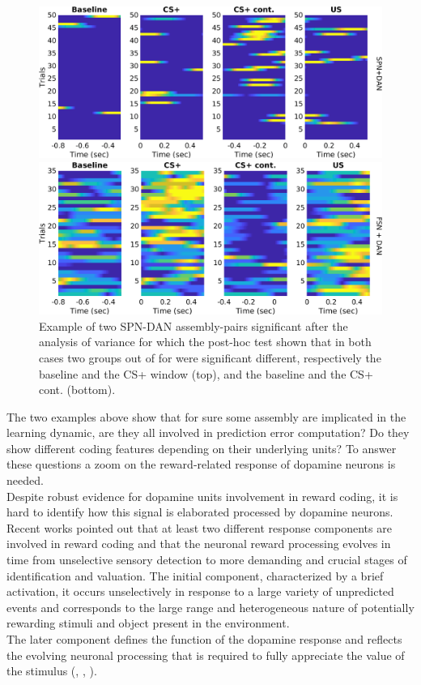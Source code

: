 \begin{figure}
    \centering
    \includegraphics[scale=0.4]{figures/SPN_DANexPreRew.png}
    
   \vspace{1cm}
   
   \includegraphics[scale=0.4]{figures/FSN_DANexStimRew.png}
    \caption{Example of two SPN-DAN assembly-pairs significant after the analysis of variance for which the post-hoc test shown that in both cases two groups out of for were significant different, respectively the baseline and the CS+ window (top), and the baseline and the CS+ cont. (bottom).}
    \label{fig:SPN_Ex}
\end{figure}
The two examples above show that for sure some assembly are implicated in the learning dynamic, are they all involved in prediction error computation? Do they show different coding features depending on their underlying units? To answer these questions a zoom on the reward-related response of dopamine neurons is needed.\\Despite robust evidence for dopamine units involvement in reward coding, it is hard to identify how this signal is elaborated processed by dopamine neurons. Recent works pointed out that at least two different response components are involved in reward coding and that the neuronal reward processing evolves in time from unselective sensory detection to more demanding and crucial stages of identification and valuation. The initial component, characterized by a brief activation, it occurs unselectively in response to a large variety of unpredicted events and corresponds to the large range and heterogeneous nature of potentially rewarding stimuli and object present in the environment.\\The later component defines the function of the dopamine response and reflects the evolving neuronal processing that is required to fully appreciate the value of the stimulus (\cite{Tobler2003}, \cite{Nomoto2010}, \cite{Fiorillo2013} \cite{Schultz2016}).\\
